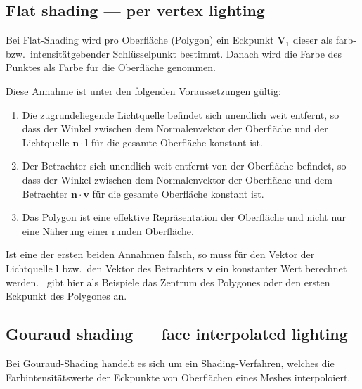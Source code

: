 \subsection{Flat shading --- per vertex lighting}
\label{subsec:flat_shading}


Bei Flat-Shading wird pro Oberfläche (Polygon) ein Eckpunkt $\bm{V}_{1}$ dieser als
farb- bzw.\ intensitätgebender Schlüsselpunkt bestimmt. Danach wird die Farbe
des Punktes als Farbe für die Oberfläche genommen.

Diese Annahme ist unter den folgenden Voraussetzungen gültig:
\begin{enumerate}
    \item{Die zugrundeliegende Lichtquelle befindet sich unendlich weit
            entfernt, so dass der Winkel zwischen dem
            Normalenvektor der Oberfläche und der Lichtquelle
            $\bm{n}\cdot{}\bm{l}$ für die gesamte Oberfläche konstant ist.}
    \item{Der Betrachter sich unendlich weit entfernt von der Oberfläche
            befindet, so dass der Winkel zwischen dem Normalenvektor der
            Oberfläche und dem Betrachter $\bm{n}\cdot{}\bm{v}$ für die
            gesamte Oberfläche konstant ist.}
    \item{Das Polygon ist eine effektive Repräsentation der Oberfläche
            und nicht nur eine Näherung einer runden Oberfläche.}
\end{enumerate}

Ist eine der ersten beiden Annahmen falsch, so muss für den Vektor der
Lichtquelle $\bm{l}$ bzw.\ den Vektor des Betrachters $\bm{v}$ ein
konstanter Wert berechnet werden.~\citeauthor{foley_computer_1996} gibt
hier als Beispiele das Zentrum des Polygones oder den ersten Eckpunkt
des Polygones an.

\subsection{Gouraud shading --- face interpolated lighting}
\label{subsec:gouraud_shading}

Bei Gouraud-Shading handelt es sich um ein Shading-Verfahren, welches die
Farbintensitätswerte der Eckpunkte von Oberflächen eines Meshes interpoloiert.

